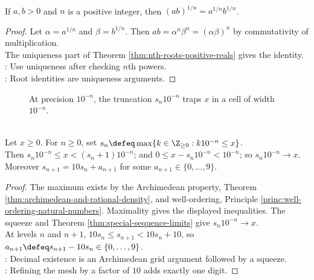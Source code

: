 \begin{corollary} \label{cor:nth-root-product-positive-reals} \\
If $a,b>0$ and $n$ is a positive integer, then $(ab)^{1/n}=a^{1/n}b^{1/n}$.
\begin{proof}
Let $\alpha=a^{1/n}$ and $\beta=b^{1/n}$. Then $ab=\alpha^n\beta^n=(\alpha\beta)^n$ by commutativity of multiplication.\\
The uniqueness part of Theorem \ref{thm:nth-roots-positive-reals} gives the identity.\\
: Use uniqueness after checking $n$th powers.\\
: Root identities are uniqueness arguments.
\end{proof}
\end{corollary}

\begin{figure}[H]
  \centering
  
  \caption{At precision $10^{-n}$, the truncation $s_n10^{-n}$ traps $x$ in a cell of width $10^{-n}$.}
  \label{fig:decimal-truncation-squeeze}
\end{figure}

\begin{proposition} \label{prop:decimal-truncations-squeeze-real} \\
Let $x\geq0$. For $n\geq0$, set $s_n\defeq\max\{k\in\Z_{\geq0}:k10^{-n}\leq x\}$.\\
Then $s_n10^{-n}\leq x < (s_n+1)10^{-n}$; and $0\leq x-s_n10^{-n}<10^{-n}$;  so $s_n10^{-n}\to x$.\\
Moreover $s_{n+1}=10s_n+a_{n+1}$ for some $a_{n+1}\in\{0,\ldots,9\}$.
\begin{proof}
The maximum exists by the Archimedean property, Theorem \ref{thm:archimedean-and-rational-density}, and well-ordering, Principle \ref{princ:well-ordering-natural-numbers}. Maximality gives the displayed inequalities. The squeeze and Theorem \ref{thm:special-sequence-limits} give $s_n10^{-n}\to x$.\\
At levels $n$ and $n+1$, $10s_n\leq s_{n+1}<10s_n+10$, so $a_{n+1}\defeq s_{n+1}-10s_n\in\{0,\ldots,9\}$.\\
: Decimal existence is an Archimedean grid argument followed by a squeeze.\\
: Refining the mesh by a factor of $10$ adds exactly one digit.
\end{proof}
\end{proposition}

